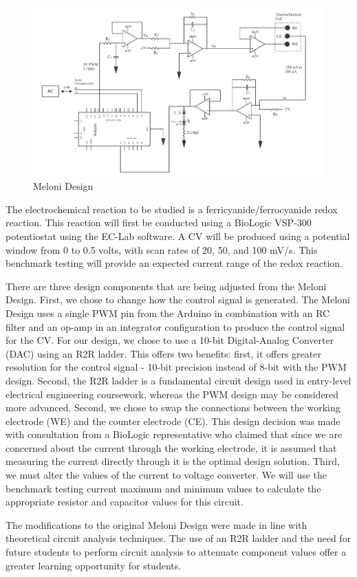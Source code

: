 \documentclass{article}
\begin{document}
\begin{figure}[H]
    \centering
    \includegraphics[width=.7\linewidth]{meloni_design.png}
    \caption{Meloni Design}
\end{figure}

The electrochemical reaction to be studied is a ferricyanide/ferrocyanide redox reaction. This reaction will first be conducted using a BioLogic VSP-300 potentiostat using the EC-Lab software. A CV will be produced using a potential window from 0 to 0.5 volts, with scan rates of 20, 50, and 100 mV/s. This benchmark testing will provide an expected current range of the redox reaction. 

There are three design components that are being adjusted from the Meloni Design. First, we chose to change how the control signal is generated. The Meloni Design uses a single PWM pin from the Arduino in combination with an RC filter and an op-amp in an integrator configuration to produce the control signal for the CV. For our design, we chose to use a 10-bit Digital-Analog Converter (DAC) using an R2R ladder. This offers two benefits: first, it offers greater resolution for the control signal - 10-bit precision instead of 8-bit with the PWM design. Second, the R2R ladder is a fundamental circuit design used in entry-level electrical engineering coursework, whereas the PWM design may be considered more advanced. Second, we chose to swap the connections between the working electrode (WE) and the counter electrode (CE). This design decision was made with consultation from a BioLogic representative who claimed that since we are concerned about the current through the working electrode, it is assumed that measuring the current directly through it is the optimal design solution. Third, we must alter the values of the current to voltage converter. We will use the benchmark testing current maximum and minimum values to calculate the appropriate resistor and capacitor values for this circuit.

The modifications to the original Meloni Design were made in line with theoretical circuit analysis techniques. The use of an R2R ladder and the need for future students to perform circuit analysis to attenuate component values offer a greater learning opportunity for students.
\end{document}
